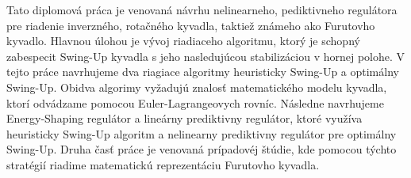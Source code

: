 Tato diplomová práca je venovaná návrhu nelinearneho, pediktivneho regulátora pre riadenie inverzného, rotačného kyvadla, taktiež známeho ako Furutovho kyvadlo. Hlavnou úlohou je vývoj riadiaceho algoritmu, ktorý je schopný zabespecit Swing-Up kyvadla s jeho nasledujúcou stabilizáciou v hornej polohe. V tejto práce navrhujeme dva riagiace algoritmy heuristicky Swing-Up a optimálny Swing-Up. Obidva algorimy vyžadujú znalosť matematického modelu kyvadla, ktorí odvádzame pomocou Euler-Lagrangeovych rovníc. Následne navrhujeme Energy-Shaping regulátor a lineárny prediktivny regulátor, ktoré využíva heuristicky Swing-Up algoritm a nelinearny prediktivny regulátor pre optimálny Swing-Up. Druha časť práce je venovaná prípadovéj štúdie, kde pomocou týchto stratégií riadime matematickú reprezentáciu Furutovho kyvadla. 